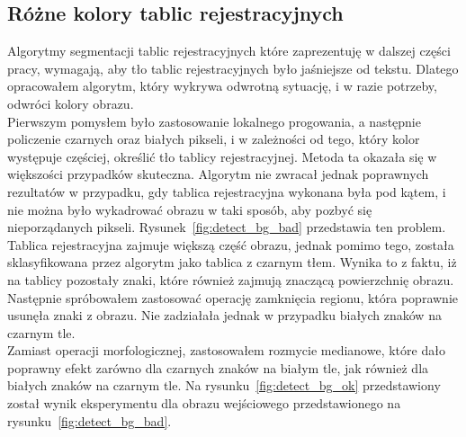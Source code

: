 \subsection{Różne kolory tablic rejestracyjnych}
Algorytmy segmentacji tablic rejestracyjnych które zaprezentuję w dalszej części pracy, wymagają, aby tło tablic rejestracyjnych było jaśniejsze od tekstu. Dlatego opracowałem algorytm, który wykrywa odwrotną sytuację, i w razie potrzeby, odwróci kolory obrazu.\\
Pierwszym pomysłem było zastosowanie lokalnego progowania, a następnie policzenie czarnych oraz białych pikseli, i w zależności od tego, który kolor występuje częściej, określić tło tablicy rejestracyjnej. Metoda ta okazała się w większości przypadków skuteczna. Algorytm nie zwracał jednak poprawnych rezultatów w przypadku, gdy tablica rejestracyjna wykonana była pod kątem, i nie można było wykadrować obrazu w taki sposób, aby pozbyć się nieporządanych pikseli. Rysunek~\ref{fig:detect_bg_bad} przedstawia ten problem. Tablica rejestracyjna zajmuje większą część obrazu, jednak pomimo tego, została sklasyfikowana przez algorytm jako tablica z czarnym tłem. Wynika to z faktu, iż na tablicy pozostały znaki, które również zajmują znaczącą powierzchnię obrazu. Następnie spróbowałem zastosować operację zamknięcia regionu, która poprawnie usunęła znaki z obrazu. Nie zadziałała jednak w przypadku białych znaków na czarnym tle. \\
Zamiast operacji morfologicznej, zastosowałem rozmycie medianowe, które dało poprawny efekt zarówno dla czarnych znaków na białym tle, jak również dla białych znaków na czarnym tle. Na rysunku~\ref{fig:detect_bg_ok} przedstawiony został wynik eksperymentu dla obrazu wejściowego przedstawionego na rysunku~\ref{fig:detect_bg_bad}.

